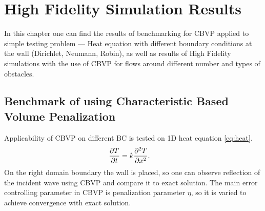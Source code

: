 \chapter{High Fidelity Simulation Results}
\label{chapter:4}
In this chapter one can find  the results of benchmarking for CBVP applied to simple testing problem --- Heat equation with different boundary conditions at the wall (Dirichlet, Neumann, Robin), as well as results of High Fidelity simulations with the use of CBVP for flows around different number and types of obstacles.

\section{Benchmark of using Characteristic Based Volume Penalization}
Applicability of CBVP on different BC is tested on 1D heat equation \eqref{eq:heat}. 
\begin{align}
\frac {\partial T}{\partial t} &= k \frac {\partial^2 T}{\partial x^2}. \label{eq:heat}
\end{align}
On the right domain boundary the wall is placed, so one can observe reflection of the incident wave using CBVP and compare it to exact solution. The main error controlling parameter in CBVP is penalization parameter $\eta$, so it is varied to achieve convergence with exact solution.

